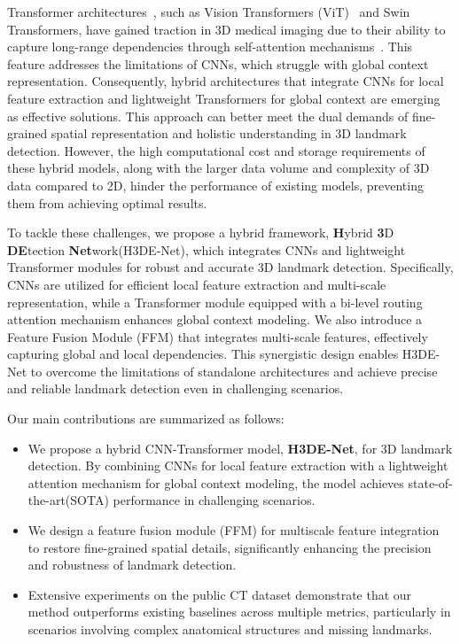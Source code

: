 Transformer architectures~\cite{vaswani2017attention}, such as Vision Transformers (ViT)~\cite{VIT} and Swin Transformers, have gained traction in 3D medical imaging due to their ability to capture long-range dependencies through self-attention mechanisms~\cite{MP-atten-seg1, mp-CNN+ATTEn1, MP-hybrid4, MP-hybrid5, MP-hybrid-2}. This feature addresses the limitations of CNNs, which struggle with global context representation. Consequently, hybrid architectures that integrate CNNs for local feature extraction and lightweight Transformers for global context are emerging as effective solutions. This approach can better meet the dual demands of fine-grained spatial representation and holistic understanding in 3D landmark detection. However, the high computational cost and storage requirements of these hybrid models, along with the larger data volume and complexity of 3D data compared to 2D, hinder the performance of existing models, preventing them from achieving optimal results. 

To tackle these challenges, we propose a hybrid framework, \textbf{H}ybrid \textbf{3}D \textbf{DE}tection \textbf{Net}work(H3DE-Net), which integrates CNNs and lightweight Transformer modules for robust and accurate 3D landmark detection. Specifically, CNNs are utilized for efficient local feature extraction and multi-scale representation, while a Transformer module equipped with a bi-level routing attention mechanism enhances global context modeling. We also introduce a Feature Fusion Module (FFM) that integrates multi-scale features, effectively capturing global and local dependencies. This synergistic design enables H3DE-Net to overcome the limitations of standalone architectures and achieve precise and reliable landmark detection even in challenging scenarios.

Our main contributions are summarized as follows:  
\begin{itemize}
    \item We propose a hybrid CNN-Transformer model, \textbf{H3DE-Net}, for 3D landmark detection. By combining CNNs for local feature extraction with a lightweight attention mechanism for global context modeling, the model achieves state-of-the-art(SOTA) performance in challenging scenarios.
    \item We design a feature fusion module (FFM) for multiscale feature integration to restore fine-grained spatial details, significantly enhancing the precision and robustness of landmark detection.
    \item Extensive experiments on the public CT dataset demonstrate that our method outperforms existing baselines across multiple metrics, particularly in scenarios involving complex anatomical structures and missing landmarks.
\end{itemize}


